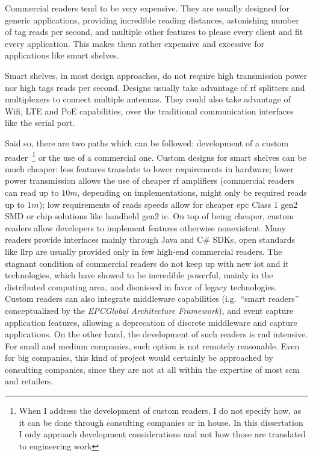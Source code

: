 Commercial readers tend to be very expensive. They are usually designed for generic applications, providing incredible reading distances, astonishing number of tag reads per second, and multiple other features to please every client and fit every application.
This makes them rather expensive and excessive for applications like smart shelves.

Smart shelves, in most design approaches, do not require high transmission power nor high tags reads per second. Designs usually take advantage of \ac{rf} splitters and multiplexers to connect multiple antennas. They could also take advantage of Wifi, LTE and PoE capabilities, over the traditional communication interfaces like the serial port.

Said so, there are two paths which can be followed: development of a custom reader~\footnote{When I address the development of custom readers, I do not specify how, as it can be done through consulting companies or in house. In this dissertation I only approach development considerations and not how those are translated to engineering work} or the use of a commercial one. 
Custom designs for smart shelves can be much cheaper: less features translate to lower requirements in hardware; lower power transmission allows the use of cheaper \ac{rf} amplifiers (commercial readers can read up to $10m$, depending on implementations, might only be required reads up to $1m$); low requirements of reads speeds allow for cheaper \ac{epc} Class 1 \ac{gen2} SMD or chip solutions like handheld \ac{gen2} \acs{ic}.
On top of being cheaper, custom readers allow developers to implement features otherwise nonexistent. Many readers provide interfaces mainly through Java and C\# SDKs, open standards like \ac{llrp} are usually provided only in few high-end commercial readers. The stagnant condition of commercial readers do not keep up with new \ac{iot} and \ac{it} technologies, which have showed to be incredible powerful, mainly in the distributed computing area, and dismissed in favor of legacy technologies.
Custom readers can also integrate middleware capabilities (i.g.\ ``smart readers'' conceptualized by the \emph{EPCGlobal Architecture Framework}), and event capture application features, allowing a deprecation of discrete middleware and capture applications.
On the other hand, the development of such readers is \ac{rnd} intensive. For small and medium companies, such option is not remotely reasonable. Even for big companies, this kind of project would certainly be approached by consulting companies, since they are not at all within the expertise of most \ac{scm} and retailers.

